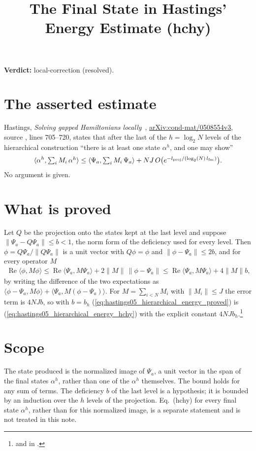 \documentclass{article}
\title{The Final State in Hastings' Energy Estimate (hchy)}
\author{}
\date{}
\providecommand{\gapnote}[2]{\par\noindent\textbf{Verdict:} #1 (#2).\par}
\begin{document}
\maketitle
\gapnote{local-correction}{resolved}

\section{The asserted estimate}
Hastings, \emph{Solving gapped Hamiltonians locally}~\cite{Hastings2006Solving},
\href{https://arxiv.org/abs/cond-mat/0508554v3}{arXiv:cond-mat/0508554v3},
source , lines 705--720, states that after the last of the
$h=\log_2N$ levels of the hierarchical construction ``there is at least one
state $\alpha^h$, and one may show''
\begin{align}
 \langle\alpha^h,\textstyle\sum_iM_i\,\alpha^h\rangle
 \le\langle\Psi_a,\textstyle\sum_iM_i\,\Psi_a\rangle
 +NJ\,O\bigl(e^{-l_{\rm proj}/(\log_2(N)\,l_{\rm fac})}\bigr).
 \label{eq:hastings05_hierarchical_energy_hchy}
\end{align}
No argument is given.

\section{What is proved}
Let $Q$ be the projection onto the states kept at the last level and suppose
$\|\Psi_a-Q\Psi_a\|\le b<1$, the norm form of the deficiency used for every
level. Then $\phi=Q\Psi_a/\|Q\Psi_a\|$ is a unit vector with $Q\phi=\phi$ and
$\|\phi-\Psi_a\|\le2b$, and for every operator $M$
\begin{align}
 \operatorname{Re}\langle\phi,M\phi\rangle
 \le\operatorname{Re}\langle\Psi_a,M\Psi_a\rangle+2\|M\|\,\|\phi-\Psi_a\|
 \le\operatorname{Re}\langle\Psi_a,M\Psi_a\rangle+4\|M\|b,
 \label{eq:hastings05_hierarchical_energy_proved}
\end{align}
by writing the difference of the two expectations as
$\langle\phi-\Psi_a,M\phi\rangle+\langle\Psi_a,M(\phi-\Psi_a)\rangle$. For
$M=\sum_{i<N}M_i$ with $\|M_i\|\le J$ the error term is $4NJb$, so with $b=b_h$
(\ref{eq:hastings05_hierarchical_energy_proved}) is
(\ref{eq:hastings05_hierarchical_energy_hchy}) with the explicit constant
$4NJb_h$.\footnote{
    and
    in .}

\section{Scope}
The state produced is the normalized image of $\Psi_a$, a unit vector in the
span of the final states $\alpha^h$, rather than one of the $\alpha^h$
themselves. The bound holds for any sum of terms. The deficiency $b$ of the last
level is a hypothesis; it is bounded by an induction over the $h$ levels of the
projection. Eq.~(hchy) for every final state $\alpha^h$, rather than for this
normalized image, is a separate statement and is not treated in this note.


\end{document}
